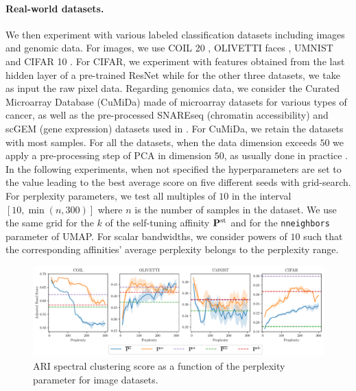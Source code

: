 \paragraph{Real-world datasets.} We then experiment with various labeled
classification datasets including images and genomic data. For images, we use
COIL 20 \citep{nene1996columbia}, OLIVETTI faces \citep{olivetti}, UMNIST
\citep{graham1998characterising} and CIFAR 10 \citep{krizhevsky2009learning}. For
CIFAR, we experiment with features obtained from the last hidden layer of a
pre-trained ResNet \citep{huyresnet} while for the other three datasets, we take
as input the raw pixel data. Regarding genomics data, we consider the Curated
Microarray Database (CuMiDa) \citep{Feltes2019} made of microarray datasets for
various types of cancer, as well as the pre-processed SNAREseq (chromatin
accessibility) and scGEM (gene expression) datasets used in
\citep{SCOT2020}. For CuMiDa, we retain the datasets with most samples. For all
the datasets, when the data dimension exceeds $50$ we apply a pre-processing
step of PCA in dimension $50$, as usually done in practice
\citep{van2008visualizing}. In the following experiments, when not specified the
hyperparameters are set to the value leading to the best average score on five
different seeds with grid-search. For perplexity parameters, we test all
multiples of $10$ in the interval $[10,\min(n,300)]$ where $n$ is the number of
samples in the dataset. We use the same grid for the $k$ of the self-tuning
affinity $\mathbf{P}^{\mathrm{st}}$ \citep{zelnik2004self} and for the
\texttt{n\textunderscore neighbors} parameter of UMAP. For scalar bandwidths, we
consider powers of $10$ such that the corresponding affinities' average perplexity belongs to the perplexity range. 

\begin{figure}[t]
    \begin{center}
    \centerline{\includegraphics[width=\columnwidth]{figures/SNEkhorn/spectral_clustering_sensitivity.pdf}}
    \caption{ARI spectral clustering score as a function of the perplexity parameter for image datasets.}
    \label{fig:spectral_clustering_sensibility}
    \end{center}
    \vspace{-1.1cm}
\end{figure}

